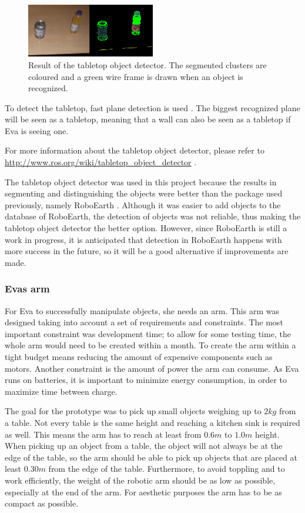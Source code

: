 \documentclass[project_eva.tex]{subfiles}
\begin{document}
\begin{figure}[h]
	\centering
	\mbox{\includegraphics[width=0.5\textwidth]{Images/object_detector.png}}
	\caption{Result of the tabletop object detector. The segmented clusters are coloured and a green wire frame is drawn when an object is recognized.}
	\label{fig:tabletop}
\end{figure}

To detect the tabletop, fast plane detection is used \cite{plane}. The biggest recognized plane will be seen as a tabletop, meaning that a wall can also be seen as a 
tabletop if Eva is seeing one.

For more information about the tabletop object detector, please refer to \url{http://www.ros.org/wiki/tabletop\_object\_detector} \cite{tabletop}.

The tabletop object detector was used in this project because the results in segmenting and distinguishing the objects were 
better than the package used previously, namely RoboEarth \cite{Roboearth}. Although it was easier to add objects to the 
database of RoboEarth, the detection of objects was not reliable, thus making the tabletop object detector the better 
option. However, since RoboEarth is still a work in progress, it is anticipated that detection in RoboEarth happens with 
more success in the future, so it will be a good alternative if improvements are made.

\subsubsection*{Eva\textquotesingle s arm}
For Eva to successfully manipulate objects, she needs an arm. This arm was designed taking into account a set of requirements and constraints. The most important constraint was development time; to allow for some testing time, the whole arm would need to be created within a month. To create the arm within a tight budget means reducing the amount of expensive components such as motors. Another constraint is the amount of power the arm can consume. As Eva runs on batteries, it is important to minimize energy consumption, in order to maximize time between charge.

The goal for the prototype was to pick up small objects weighing up to $2kg$ from a table. Not every table is the same height and reaching a kitchen sink is required as well. This means the arm has to reach at least from $0.6m$ to $1.0m$ height. When picking up an object from a table, the object will not always be at the edge of the table, so the arm should be able to pick up objects that are placed at least $0.30m$ from the edge of the table. Furthermore, to avoid toppling and to work efficiently, the weight of the robotic arm should be as low as possible, especially at the end of the arm. For aesthetic purposes the arm has to be as compact as possible.
\end{document}
